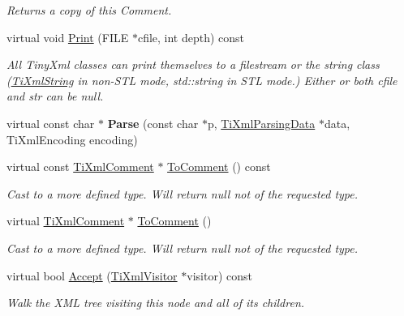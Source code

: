 \begin{DoxyCompactItemize}
\begin{DoxyCompactList}\small\item\em Returns a copy of this Comment. \end{DoxyCompactList}\item 
virtual void \hyperlink{class_ti_xml_comment_a17398061d62c470f57801ce28fa33ad4}{Print} (F\+I\+LE $\ast$cfile, int depth) const 
\begin{DoxyCompactList}\small\item\em All Tiny\+Xml classes can print themselves to a filestream or the string class (\hyperlink{class_ti_xml_string}{Ti\+Xml\+String} in non-\/\+S\+TL mode, std\+::string in S\+TL mode.) Either or both cfile and str can be null. \end{DoxyCompactList}\item 
virtual const char $\ast$ {\bfseries Parse} (const char $\ast$p, \hyperlink{class_ti_xml_parsing_data}{Ti\+Xml\+Parsing\+Data} $\ast$data, Ti\+Xml\+Encoding encoding)\hypertarget{class_ti_xml_comment_a43bddc18ac057734b41d84653b71d3e0}{}\label{class_ti_xml_comment_a43bddc18ac057734b41d84653b71d3e0}

\item 
virtual const \hyperlink{class_ti_xml_comment}{Ti\+Xml\+Comment} $\ast$ \hyperlink{class_ti_xml_comment_a00fb4215c20a2399ea05ac9b9e7e68a0}{To\+Comment} () const \hypertarget{class_ti_xml_comment_a00fb4215c20a2399ea05ac9b9e7e68a0}{}\label{class_ti_xml_comment_a00fb4215c20a2399ea05ac9b9e7e68a0}

\begin{DoxyCompactList}\small\item\em Cast to a more defined type. Will return null not of the requested type. \end{DoxyCompactList}\item 
virtual \hyperlink{class_ti_xml_comment}{Ti\+Xml\+Comment} $\ast$ \hyperlink{class_ti_xml_comment_acc7c7e07e13c23f17797d642981511df}{To\+Comment} ()\hypertarget{class_ti_xml_comment_acc7c7e07e13c23f17797d642981511df}{}\label{class_ti_xml_comment_acc7c7e07e13c23f17797d642981511df}

\begin{DoxyCompactList}\small\item\em Cast to a more defined type. Will return null not of the requested type. \end{DoxyCompactList}\item 
virtual bool \hyperlink{class_ti_xml_comment_a4382de0e50da973f11a23ea5852568bd}{Accept} (\hyperlink{class_ti_xml_visitor}{Ti\+Xml\+Visitor} $\ast$visitor) const \hypertarget{class_ti_xml_comment_a4382de0e50da973f11a23ea5852568bd}{}\label{class_ti_xml_comment_a4382de0e50da973f11a23ea5852568bd}

\begin{DoxyCompactList}\small\item\em Walk the X\+ML tree visiting this node and all of its children. \end{DoxyCompactList}\end{DoxyCompactItemize}
